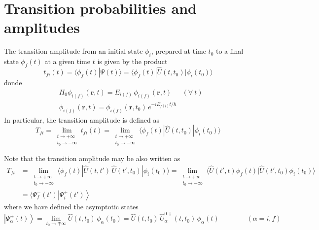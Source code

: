 \section{Transition probabilities and amplitudes}

\label{S:trans-prob-ampl}

The transition amplitude from an initial state $\phi_{i}$, prepared at time $t_{0}$ to a final state  $\phi_{f}(t)$ at a given time $t$ is given by the product 
%
\begin{equation} \label{Q:td-transi-ampli-t}
  t_{fi}(t)= \langle \phi_{f}(t) | \Psi(t) \rangle = \big\langle \phi_{f}(t) |\hat{U}(t,t_{0}) | \phi_{i}(t_{0}) \big\rangle 
\end{equation}
donde
%
\begin{subequations}
  \begin{align}
    &H_{0} \phi_{i(f)}(\bm{r},t)= E_{i(f)} \, \phi_{i(f)}(\bm{r},t)  & (\forall~ t )\\
    &\phi_{i(f)}(\bm{r},t)=   \phi_{i(f)}(\bm{r},t_{0})\, e^{-iE_{f(i)}t/\hbar}  &
  \end{align}
\end{subequations}
In particular, the transition amplitude is defined as
\begin{equation} \label{Q:td-defin-transi-ampli}
 T_{fi}= \lim_{\substack{t\to +\infty\\t_{0}\to -\infty}} t_{fi}(t)= \lim_{\substack{t\to +\infty\\t_{0}\to -\infty}} \big\langle \phi_{f}(t) |\hat{U}(t,t_{0}) | \phi_{i}(t_{0}) \big\rangle 
\end{equation}

Note that the transition amplitude may be also written as
\begin{align} \label{Q:td-transi-ampli-1}
 T_{fi}&= \lim_{\substack{t\to +\infty\\t_{0}\to -\infty}}  \big\langle \phi_{f}(t) |\hat{U}(t,t')\,\hat{U}(t',t_{0}) | \phi_{i}(t_{0}) \big\rangle  
=  \lim_{\substack{t\to +\infty\\t_{0}\to -\infty}} \big\langle \hat{U}(t',t) \phi_{f}(t) |\hat{U}(t',t_{0}) \phi_{i}(t_{0}) \big\rangle \nonumber\\
&= \big\langle \Psi^{-}_{f}(t') \left|\Psi^{+}_{i}(t') \right\rangle 
\end{align}
where we have defined the asymptotic states
\begin{equation}\label{Q:td-defin-asymp-state}
  \left| \Psi^{\pm}_{\alpha}(t) \right\rangle= \lim_{t_{0}\to \mp \infty} \hat{U}(t,t_{0})\, \phi_{\alpha}(t_{0})= \hat{U}(t,t_{0})\,\hat{U}_{\alpha}^{0\, \dag}(t,t_{0})\, \phi_{\alpha}(t) \qquad \qquad (\alpha= i,f)
\end{equation}

